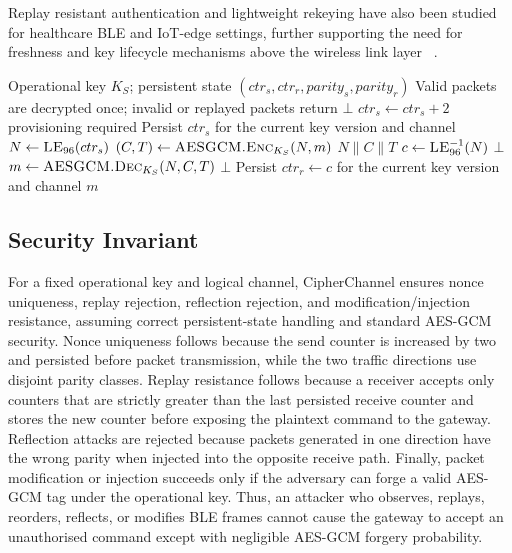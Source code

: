 \documentclass[journal]{IEEEtran}
\begin{document}
Replay resistant authentication and lightweight rekeying have also been studied for healthcare BLE and IoT-edge settings, further supporting the need for freshness and key lifecycle mechanisms above the wireless link layer ~\cite{rakshit2025dsekp}.

\begin{algorithm}[!t]
\caption{Counter-Nonce CipherChannel Send and Receive}
\label{alg:counternonce}
\footnotesize
\begin{algorithmic}[1]
\Require Operational key $K_S$; persistent state $(ctr_s, ctr_r, parity_s, parity_r)$
\Ensure Valid packets are decrypted once; invalid or replayed packets return $\bot$
  \State $ctr_s \leftarrow ctr_s + 2$
   \State \Return provisioning required \EndIf
  \State Persist $ctr_s$ for the current key version and channel
  \State $N \leftarrow \textsc{LE}_{96}(ctr_s)$
  \State $(C,T) \leftarrow \textsc{AESGCM.Enc}_{K_S}(N,m)$
  \State \Return $N \| C \| T$
\EndFunction
\Statex
{}
  \State $c \leftarrow \textsc{LE}^{-1}_{96}(N)$
   \State \Return $\bot$ \EndIf
  \State $m \leftarrow \textsc{AESGCM.Dec}_{K_S}(N,C,T)$
   \State \Return $\bot$ \EndIf
  \State Persist $ctr_r \leftarrow c$ for the current key version and channel
  \State \Return $m$
\EndFunction
\end{algorithmic}
\end{algorithm}

\subsection{Security Invariant}
\label{sec:securityinvariants}

For a fixed operational key and logical channel, CipherChannel ensures nonce uniqueness, replay rejection, reflection rejection, and modification/injection resistance, assuming correct persistent-state handling and standard AES-GCM security. Nonce uniqueness follows because the send counter is increased by two and persisted before packet transmission, while the two traffic directions use disjoint parity classes. Replay resistance follows because a receiver accepts only counters that are strictly greater than the last persisted receive counter and stores the new counter before exposing the plaintext command to the gateway. Reflection attacks are rejected because packets generated in one direction have the wrong parity when injected into the opposite receive path. Finally, packet modification or injection succeeds only if the adversary can forge a valid AES-GCM tag under the operational key. Thus, an attacker who observes, replays, reorders, reflects, or modifies BLE frames cannot cause the gateway to accept an unauthorised command except with negligible AES-GCM forgery probability.
\end{document}
